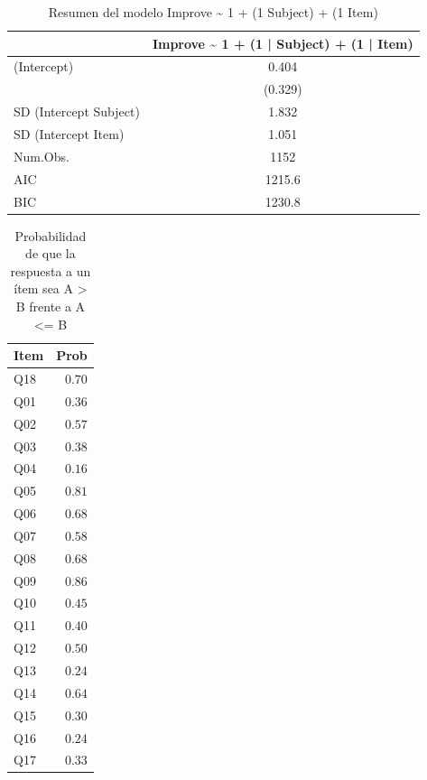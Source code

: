 \documentclass[
  12pt,
  a4paper,
  extrafontsizes,
  onecolumn,
  openright,
  table]{memoir}
\begin{document}
\normalsize

\hypertarget{tbl-selected-logistic}{}
\begin{table}
\caption{\label{tbl-selected-logistic}Resumen del modelo Improve \textasciitilde{} 1 + (1 \textbar{} Subject)
+ (1 \textbar{} Item) }\tabularnewline

\centering
\begin{tabular}[t]{lc}
\toprule
  & Improve \textasciitilde{} 1 + (1 | Subject) + (1 | Item)\\
\midrule
(Intercept) & \num{0.404}\\
 & (\num{0.329})\\
SD (Intercept Subject) & \num{1.832}\\
SD (Intercept Item) & \num{1.051}\\
\midrule
Num.Obs. & \num{1152}\\
AIC & \num{1215.6}\\
BIC & \num{1230.8}\\
\bottomrule
\end{tabular}
\end{table}

\scriptsize

\hypertarget{tbl-improve-question}{}
\begin{longtable}{lr}
\caption{\label{tbl-improve-question}Probabilidad de que la respuesta a un ítem sea A \textgreater{} B frente
a A \textless= B }\tabularnewline

\toprule
Item & Prob \\ 
\midrule
Q18 & $0.70$ \\ 
Q01 & $0.36$ \\ 
Q02 & $0.57$ \\ 
Q03 & $0.38$ \\ 
Q04 & $0.16$ \\ 
Q05 & $0.81$ \\ 
Q06 & $0.68$ \\ 
Q07 & $0.58$ \\ 
Q08 & $0.68$ \\ 
Q09 & $0.86$ \\ 
Q10 & $0.45$ \\ 
Q11 & $0.40$ \\ 
Q12 & $0.50$ \\ 
Q13 & $0.24$ \\ 
Q14 & $0.64$ \\ 
Q15 & $0.30$ \\ 
Q16 & $0.24$ \\ 
Q17 & $0.33$ \\ 
\bottomrule
\end{longtable}
\end{document}
